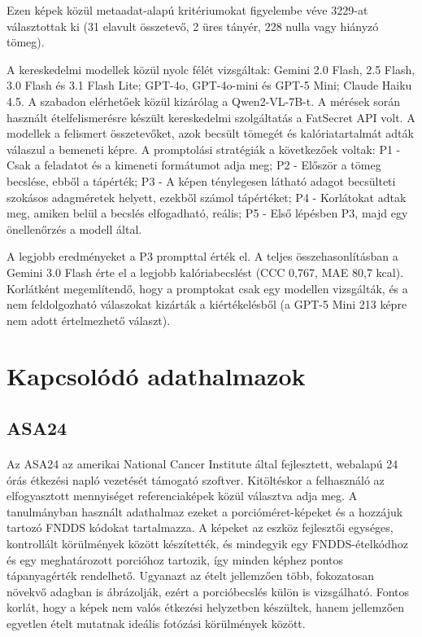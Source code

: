 Ezen képek közül metaadat-alapú kritériumokat figyelembe véve  3229-at választottak ki (31 elavult összetevő, 2 üres tányér, 228 nulla vagy hiányzó tömeg).

A kereskedelmi modellek közül nyolc félét vizsgáltak: Gemini 2.0 Flash, 2.5 Flash, 3.0 Flash és 3.1 Flash Lite; GPT-4o, GPT-4o-mini és GPT-5 Mini; Claude Haiku 4.5. A szabadon elérhetőek közül kizárólag a Qwen2-VL-7B-t.
A mérések során használt ételfelismerésre készült kereskedelmi szolgáltatás a FatSecret API volt. A modellek a felismert összetevőket, azok becsült tömegét és kalóriatartalmát adták válaszul a bemeneti képre.
A promptolási stratégiák a következőek voltak:
P1 - Csak a feladatot és a kimeneti formátumot adja meg;
P2 - Először a tömeg becslése, ebből a tápérték;
P3 - A képen ténylegesen látható adagot becsülteti szokásos adagméretek helyett, ezekből számol tápértéket;
P4 - Korlátokat adtak meg, amiken belül a becslés elfogadható, reális;
P5 - Első lépésben P3, majd egy önellenőrzés a modell által.

A legjobb eredményeket a P3 prompttal érték el. A teljes összehasonlításban a Gemini 3.0 Flash érte el a legjobb kalóriabecslést (CCC 0,767, MAE 80,7 kcal).
Korlátként megemlítendő, hogy a promptokat csak egy modellen vizsgálták, és a nem feldolgozható válaszokat kizárták a kiértékelésből (a GPT-5 Mini 213 képre nem adott értelmezhető választ).

\section{Kapcsolódó adathalmazok}

\subsection{ASA24}
\paragraph{}Az ASA24 \cite{subar2012asa24} az amerikai National Cancer Institute által fejlesztett, webalapú 24 órás étkezési napló vezetését támogató szoftver. Kitöltéskor a felhasználó az elfogyasztott mennyiséget referenciaképek közül választva adja meg. A tanulmányban használt adathalmaz ezeket a porcióméret-képeket és a hozzájuk tartozó FNDDS kódokat tartalmazza. A képeket az eszköz fejlesztői egységes, kontrollált körülmények között készítették, és mindegyik egy FNDDS-ételkódhoz és egy meghatározott porcióhoz tartozik, így minden képhez pontos tápanyagérték rendelhető. Ugyanazt az ételt jellemzően több, fokozatosan növekvő adagban is ábrázolják, ezért a porcióbecslés külön is vizsgálható. Fontos korlát, hogy a képek nem valós étkezési helyzetben készültek, hanem jellemzően egyetlen ételt mutatnak ideális fotózási körülmények között.

